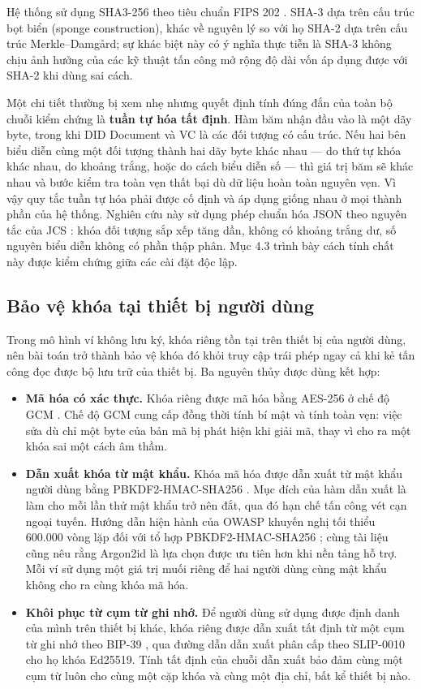 Hệ thống sử dụng SHA3-256 theo tiêu chuẩn FIPS 202 \cite{NIST_FIPS202}. SHA-3 dựa trên cấu trúc bọt biển (sponge construction), khác về nguyên lý so với họ SHA-2 dựa trên cấu trúc Merkle--Damgård; sự khác biệt này có ý nghĩa thực tiễn là SHA-3 không chịu ảnh hưởng của các kỹ thuật tấn công mở rộng độ dài vốn áp dụng được với SHA-2 khi dùng sai cách.

Một chi tiết thường bị xem nhẹ nhưng quyết định tính đúng đắn của toàn bộ chuỗi kiểm chứng là \textbf{tuần tự hóa tất định}. Hàm băm nhận đầu vào là một dãy byte, trong khi DID Document và VC là các đối tượng có cấu trúc. Nếu hai bên biểu diễn cùng một đối tượng thành hai dãy byte khác nhau --- do thứ tự khóa khác nhau, do khoảng trắng, hoặc do cách biểu diễn số --- thì giá trị băm sẽ khác nhau và bước kiểm tra toàn vẹn thất bại dù dữ liệu hoàn toàn nguyên vẹn. Vì vậy quy tắc tuần tự hóa phải được cố định và áp dụng giống nhau ở mọi thành phần của hệ thống. Nghiên cứu này sử dụng phép chuẩn hóa JSON theo nguyên tắc của JCS \cite{RFC8785}: khóa đối tượng sắp xếp tăng dần, không có khoảng trắng dư, số nguyên biểu diễn không có phần thập phân. Mục 4.3 trình bày cách tính chất này được kiểm chứng giữa các cài đặt độc lập.

\subsection{Bảo vệ khóa tại thiết bị người dùng}

Trong mô hình ví không lưu ký, khóa riêng tồn tại trên thiết bị của người dùng, nên bài toán trở thành bảo vệ khóa đó khỏi truy cập trái phép ngay cả khi kẻ tấn công đọc được bộ lưu trữ của thiết bị. Ba nguyên thủy được dùng kết hợp:

\begin{itemize}
    \item \textbf{Mã hóa có xác thực.} Khóa riêng được mã hóa bằng AES-256 ở chế độ GCM \cite{NIST_SP800_38D}. Chế độ GCM cung cấp đồng thời tính bí mật và tính toàn vẹn: việc sửa dù chỉ một byte của bản mã bị phát hiện khi giải mã, thay vì cho ra một khóa sai một cách âm thầm.
    \item \textbf{Dẫn xuất khóa từ mật khẩu.} Khóa mã hóa được dẫn xuất từ mật khẩu người dùng bằng PBKDF2-HMAC-SHA256 \cite{NIST_SP800_132}. Mục đích của hàm dẫn xuất là làm cho mỗi lần thử mật khẩu trở nên đắt, qua đó hạn chế tấn công vét cạn ngoại tuyến. Hướng dẫn hiện hành của OWASP khuyến nghị tối thiểu 600.000 vòng lặp đối với tổ hợp PBKDF2-HMAC-SHA256 \cite{OWASP_PasswordStorage}; cùng tài liệu cũng nêu rằng Argon2id là lựa chọn được ưu tiên hơn khi nền tảng hỗ trợ. Mỗi ví sử dụng một giá trị muối riêng để hai người dùng cùng mật khẩu không cho ra cùng khóa mã hóa.
    \item \textbf{Khôi phục từ cụm từ ghi nhớ.} Để người dùng sử dụng được định danh của mình trên thiết bị khác, khóa riêng được dẫn xuất tất định từ một cụm từ ghi nhớ theo BIP-39 \cite{BIP39}, qua đường dẫn dẫn xuất phân cấp theo SLIP-0010 \cite{SLIP0010} cho họ khóa Ed25519. Tính tất định của chuỗi dẫn xuất bảo đảm cùng một cụm từ luôn cho cùng một cặp khóa và cùng một địa chỉ, bất kể thiết bị nào.
\end{itemize}

